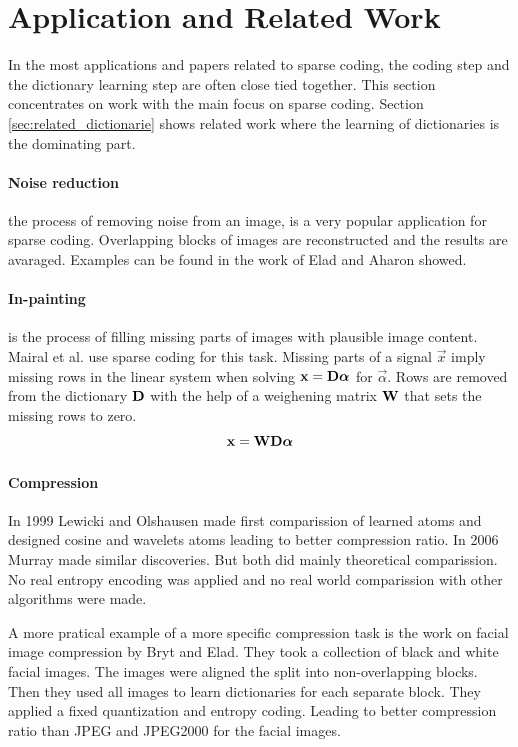 \section{Application and Related Work}
\label{sec:sparse_related}
In the most applications and papers related to sparse coding, the coding
step and the dictionary learning step are often close tied together. This
section concentrates on work with the main focus on sparse coding. Section
\ref{sec:related_dictionarie} shows related work where the learning of
dictionaries is the dominating part.

\paragraph{Noise reduction} the process of removing noise from an image, is a
very popular application for sparse coding.  Overlapping blocks of images are
reconstructed and the results are avaraged. Examples can be found in the work of
Elad and Aharon showed\cite{Elad2006}.

\paragraph{In-painting} is the process of filling missing parts of images with
plausible image content. Mairal et al.\cite{mairal08sparse} use sparse coding
for this task. Missing parts of a signal $\vec{x}$ imply missing rows in the
linear system when solving $\boldsymbol{\mathrm{x}} = \boldsymbol{\mathrm{D}}\boldsymbol{\mathrm{\alpha}}$ for $\vec{\alpha}$.
Rows are removed from the dictionary $\boldsymbol{\mathrm{D}}$ with the help of a weighening
matrix $\boldsymbol{\mathrm{W}}$ that sets the missing rows to zero.
\begin{equation*}
\boldsymbol{\mathrm{x}} = \boldsymbol{\mathrm{W}}\boldsymbol{\mathrm{D}}\boldsymbol{\mathrm{\alpha}}\\
\end{equation*}

\paragraph{Compression} In 1999 Lewicki and Olshausen\cite{Lewicki1999} made
first comparission of learned atoms and designed cosine and wavelets atoms
leading to better compression ratio. In 2006 Murray\cite{Murray2006} made
similar discoveries. But both did mainly theoretical comparission. No real
entropy encoding was applied and no real world comparission with other
algorithms were made.

A more pratical example of a more specific compression task is the work on
facial image compression by Bryt and Elad\cite{Bryt2008}. They took a
collection of black and white facial images. The images were aligned the split
into non-overlapping blocks. Then they used all images to learn dictionaries for
each separate block. They applied a fixed quantization and entropy coding.
Leading to better compression ratio than JPEG and JPEG2000 for the facial
images.


